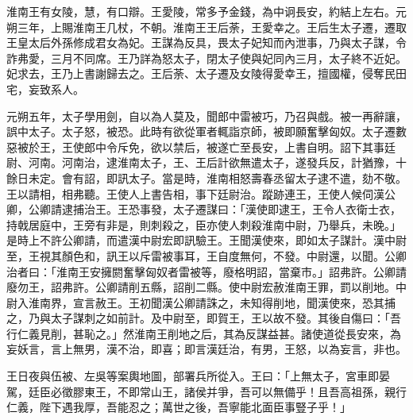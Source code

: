 \begin{pinyinscope}
淮南王有女陵，慧，有口辯。王愛陵，常多予金錢，為中诇長安，約結上左右。元朔三年，上賜淮南王几杖，不朝。淮南王王后荼，王愛幸之。王后生太子遷，遷取王皇太后外孫修成君女為妃。王謀為反具，畏太子妃知而內泄事，乃與太子謀，令詐弗愛，三月不同席。王乃詳為怒太子，閉太子使與妃同內三月，太子終不近妃。妃求去，王乃上書謝歸去之。王后荼、太子遷及女陵得愛幸王，擅國權，侵奪民田宅，妄致系人。

元朔五年，太子學用劍，自以為人莫及，聞郎中雷被巧，乃召與戲。被一再辭讓，誤中太子。太子怒，被恐。此時有欲從軍者輒詣京師，被即願奮擊匈奴。太子遷數惡被於王，王使郎中令斥免，欲以禁后，被遂亡至長安，上書自明。詔下其事廷尉、河南。河南治，逮淮南太子，王、王后計欲無遣太子，遂發兵反，計猶豫，十餘日未定。會有詔，即訊太子。當是時，淮南相怒壽春丞留太子逮不遣，劾不敬。王以請相，相弗聽。王使人上書告相，事下廷尉治。蹤跡連王，王使人候伺漢公卿，公卿請逮捕治王。王恐事發，太子遷謀曰：「漢使即逮王，王令人衣衛士衣，持戟居庭中，王旁有非是，則刺殺之，臣亦使人刺殺淮南中尉，乃舉兵，未晚。」是時上不許公卿請，而遣漢中尉宏即訊驗王。王聞漢使來，即如太子謀計。漢中尉至，王視其顏色和，訊王以斥雷被事耳，王自度無何，不發。中尉還，以聞。公卿治者曰：「淮南王安擁閼奮擊匈奴者雷被等，廢格明詔，當棄市。」詔弗許。公卿請廢勿王，詔弗許。公卿請削五縣，詔削二縣。使中尉宏赦淮南王罪，罰以削地。中尉入淮南界，宣言赦王。王初聞漢公卿請誅之，未知得削地，聞漢使來，恐其捕之，乃與太子謀刺之如前計。及中尉至，即賀王，王以故不發。其後自傷曰：「吾行仁義見削，甚恥之。」然淮南王削地之后，其為反謀益甚。諸使道從長安來，為妄妖言，言上無男，漢不治，即喜；即言漢廷治，有男，王怒，以為妄言，非也。

王日夜與伍被、左吳等案輿地圖，部署兵所從入。王曰：「上無太子，宮車即晏駕，廷臣必徵膠東王，不即常山王，諸侯并爭，吾可以無備乎！且吾高祖孫，親行仁義，陛下遇我厚，吾能忍之；萬世之後，吾寧能北面臣事豎子乎！」


\end{pinyinscope}

